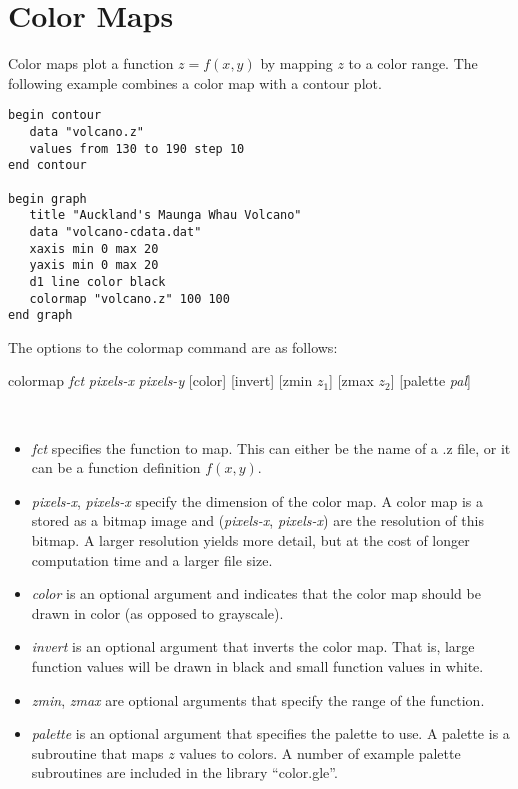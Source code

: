 \section{Color Maps}
\label{colormap}

Color maps plot a function $z = f(x,y)$ by mapping $z$ to a color range. The following example combines a color map with a contour plot.

\begin{minipage}[c]{8cm}
\begin{Verbatim}
begin contour
   data "volcano.z"
   values from 130 to 190 step 10
end contour

begin graph
   title "Auckland's Maunga Whau Volcano"
   data "volcano-cdata.dat"
   xaxis min 0 max 20
   yaxis min 0 max 20
   d1 line color black
   colormap "volcano.z" 100 100
end graph
\end{Verbatim}
\end{minipage}
\hfill
\begin{minipage}[c]{7cm}
\ifdefined\APPLE
\else
\mbox{}
\fi
\end{minipage}

The options to the colormap command are as follows:

\begin{commanddescription}
\item[{\sf colormap {\it fct} {\it pixels-x} {\it pixels-y} [color] [invert] [zmin $z_1$]  [zmax $z_2$] [palette {\it pal}]}]

\mbox{}\\
\begin{itemize}
\item {\it fct} specifies the function to map. This can either be the name of a .z file, or it can be a function definition $f(x,y)$.

\item {\it pixels-x}, {\it pixels-x} specify the dimension of the color map. A color map is a stored as a bitmap image and ({\it pixels-x}, {\it pixels-x}) are the resolution of this bitmap. A larger resolution yields more detail, but at the cost of longer computation time and a larger file size.

\item {\it color} is an optional argument and indicates that the color map should be drawn in color (as opposed to grayscale).

\item {\it invert} is an optional argument that inverts the color map. That is, large function values will be drawn in black and small function values in white.

\item {\it zmin}, {\it zmax} are optional arguments that specify the range of the function.

\item {\it palette} is an optional argument that specifies the palette to use. A palette is a subroutine that maps $z$ values to colors. A number of example palette subroutines are included in the library ``color.gle''.
\end{itemize}
\end{commanddescription}

